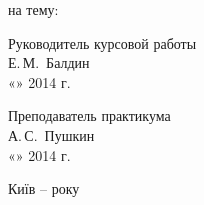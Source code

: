 \documentclass[]{lib/styles/additional-docs}
\begin{document}
\begin{titlepage}
\begin{center}
      на тему:  \\

    \end{center}
  \vfill
   
  \newlength{\ML}
  \hfill\begin{minipage}{0.4\textwidth}
    Руководитель курсовой работы\\
    \underline{\hspace{\ML}} Е.\,М.~Балдин\\
    «\underline{\hspace{0.7cm}}» \underline{\hspace{2cm}} 2014 г.
  \end{minipage}%
  \bigskip
   
  \hfill\begin{minipage}{0.4\textwidth}
    Преподаватель практикума\\
    \underline{\hspace{\ML}} А.\,С.~Пушкин\\
    «\underline{\hspace{0.7cm}}» \underline{\hspace{2cm}} 2014 г.
  \end{minipage}%
  \vfill
   
  \begin{center}
    Київ – \currentYear року
  \end{center}
  \end{titlepage}
\end{document}
